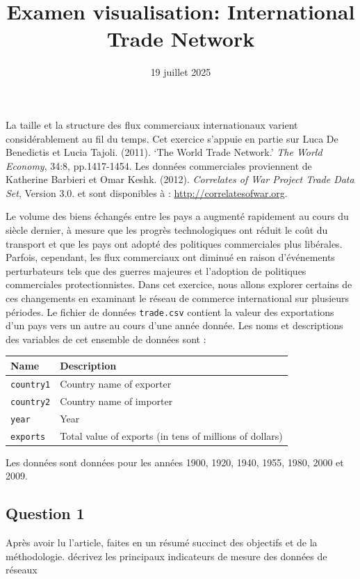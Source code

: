 \documentclass[
]{article}
\title{Examen visualisation: International Trade Network}
\author{}
\date{\vspace{-2.5em}19 juillet 2025}
\begin{document}
\maketitle

La taille et la structure des flux commerciaux internationaux varient
considérablement au fil du temps. Cet exercice s'appuie en partie sur
Luca De Benedictis et Lucia Tajoli. (2011). `The World Trade Network.'
\emph{The World Economy}, 34:8, pp.1417-1454. Les données commerciales
proviennent de Katherine Barbieri et Omar Keshk. (2012).
\emph{Correlates of War Project Trade Data Set}, Version 3.0. et sont
disponibles à : \url{http://correlatesofwar.org}.

Le volume des biens échangés entre les pays a augmenté rapidement au
cours du siècle dernier, à mesure que les progrès technologiques ont
réduit le coût du transport et que les pays ont adopté des politiques
commerciales plus libérales. Parfois, cependant, les flux commerciaux
ont diminué en raison d'événements perturbateurs tels que des guerres
majeures et l'adoption de politiques commerciales protectionnistes. Dans
cet exercice, nous allons explorer certains de ces changements en
examinant le réseau de commerce international sur plusieurs périodes. Le
fichier de données \texttt{trade.csv} contient la valeur des
exportations d'un pays vers un autre au cours d'une année donnée. Les
noms et descriptions des variables de cet ensemble de données sont :

\begin{longtable}[]{@{}ll@{}}
\toprule\noalign{}
Name & Description \\
\midrule\noalign{}
\endhead
\bottomrule\noalign{}
\endlastfoot
\texttt{country1} & Country name of exporter \\
\texttt{country2} & Country name of importer \\
\texttt{year} & Year \\
\texttt{exports} & Total value of exports (in tens of millions of
dollars) \\
\end{longtable}

Les données sont données pour les années 1900, 1920, 1940, 1955, 1980,
2000 et 2009.

\subsection{Question 1}\label{question-1}

Après avoir lu l'article, faites en un résumé succinct des objectifs et
de la méthodologie. décrivez les principaux indicateurs de mesure des
données de réseaux
\end{document}
